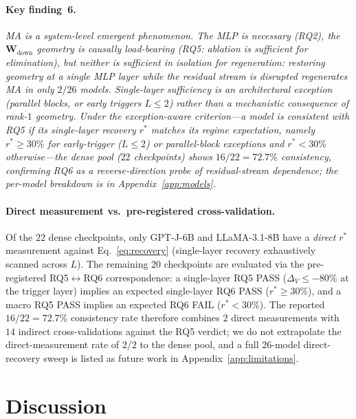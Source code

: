 \documentclass{article}
\newcommand{\Wdown}{\mathbf{W}_{\text{down}}}
\begin{document}
\paragraph{Key finding~6.}
\emph{MA is a \emph{system-level} emergent phenomenon. The MLP is
necessary (RQ2), the $\Wdown$ geometry is causally load-bearing
(RQ5: ablation is sufficient for elimination), but neither is
\emph{sufficient in isolation for regeneration}: restoring geometry at a
single MLP layer while the residual stream is disrupted regenerates MA in
only $2/26$ models. Single-layer sufficiency is an architectural exception (parallel blocks,
or early triggers $L \leq 2$) rather than a mechanistic consequence of
rank-$1$ geometry. Under the exception-aware criterion---a model is
\emph{consistent} with RQ5 if its single-layer recovery $r^{*}$ matches
its regime expectation, namely $r^{*} \geq 30\%$ for early-trigger
($L \leq 2$) or parallel-block exceptions and $r^{*} < 30\%$
otherwise---the dense pool ($22$ checkpoints) shows
$16/22 = 72.7\%$ consistency, confirming RQ6 as a reverse-direction
probe of residual-stream dependence; the per-model breakdown is in
Appendix~\ref{app:models}.}

\paragraph{Direct measurement vs.\ pre-registered cross-validation.}
\label{sec:rq6-direct-vs-indirect}
Of the $22$ dense checkpoints, only GPT-J-6B and LLaMA-3.1-8B have a
\emph{direct} $r^{*}$ measurement against Eq.~\eqref{eq:recovery}
(single-layer recovery exhaustively scanned across $L$). The remaining
$20$ checkpoints are evaluated via the pre-registered
RQ5$\leftrightarrow$RQ6 correspondence: a single-layer RQ5 PASS
($\Delta_V \leq -80\%$ at the trigger layer) implies an expected
single-layer RQ6 PASS ($r^{*} \geq 30\%$), and a macro RQ5 PASS implies
an expected RQ6 FAIL ($r^{*} < 30\%$). The reported $16/22 = 72.7\%$
consistency rate therefore combines $2$ direct measurements with $14$
indirect cross-validations against the RQ5 verdict; we do not extrapolate
the direct-measurement rate of $2/2$ to the dense pool, and a full
$26$-model direct-recovery sweep is listed as future work in
Appendix~\ref{app:limitations}.

\section{Discussion}
\label{sec:discussion}
\end{document}
